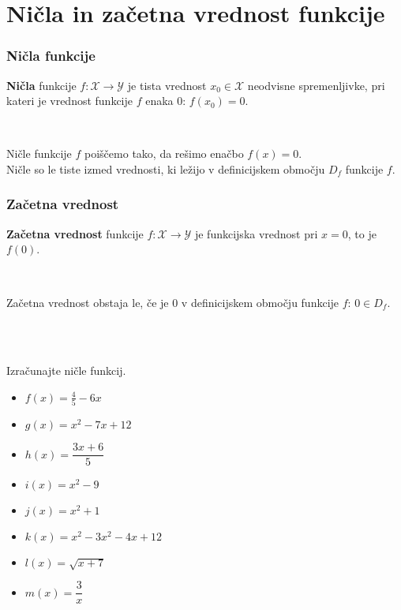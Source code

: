 \newpage


    \section{Ničla in začetna vrednost funkcije}

    \subsubsection*{Ničla funkcije}
        \textbf{Ničla} funkcije $f:\mathcal{X}\to\mathcal{Y}$ je tista vrednost $x_0\in\mathcal{X}$ neodvisne spremenljivke, 
        pri kateri je vrednost funkcije $f$ enaka $0$: $f(x_0)=0$.

        ~

        Ničle funkcije $f$ poiščemo tako, da rešimo enačbo $f(x)=0$. \\
        Ničle so le tiste izmed vrednosti, ki ležijo v definicijskem območju $D_f$ funkcije $f$.

        
    \subsubsection*{Začetna vrednost}
        \textbf{Začetna vrednost} funkcije $f:\mathcal{X}\to\mathcal{Y}$ je funkcijska vrednost pri $x=0$, to je $f(0)$.

        ~

        Začetna vrednost obstaja le, če je $0$ v definicijskem območju funkcije $f$: $0\in D_f$.

        
~\\~\\




    \begin{naloga}
        Izračunajte ničle funkcij.
                \begin{multicols}{2}

            \begin{itemize}
                \item $f(x)=\frac{4}{5}-6x$ 
                \item $g(x)=x^2-7x+12$ 
                \item $h(x)=\dfrac{3x+6}{5}$ 
                \item $i(x)=x^2-9$ 
                \item $j(x)=x^2+1$ 
                \item $k(x)=x^2-3x^2-4x+12$ 
                \item $l(x)=\sqrt{x+7}$ 
                \item $m(x)=\dfrac{3}{x}$ 
            \end{itemize}
        \end{multicols}
    \end{naloga}


